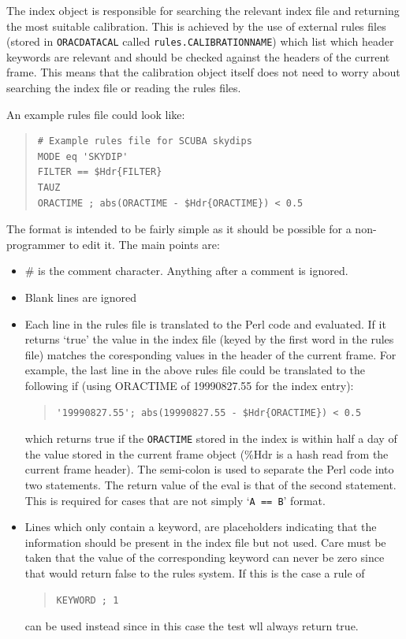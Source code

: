 \documentclass[twoside,11pt]{article}
\renewcommand{\_}{\texttt{\symbol{95}}}
\newenvironment{myquote}{\begin{quote}\begin{small}}{\end{small}\end{quote}}
\begin{document}
The index object is responsible for searching the relevant index
file and returning the most suitable calibration. This is achieved by
the use of external rules files (stored in \texttt{ORAC\_DATA\_CAL}
called \texttt{rules.CALIBRATION\_NAME}) which list which header
keywords are relevant and should be checked against the headers of the
current frame. This means that the calibration object itself does not
need to worry about searching the index file or reading the rules
files. 

An example rules file could look like:
\begin{myquote}
\begin{verbatim}
# Example rules file for SCUBA skydips
MODE eq 'SKYDIP'
FILTER == $Hdr{FILTER}
TAUZ
ORACTIME ; abs(ORACTIME - $Hdr{ORACTIME}) < 0.5
\end{verbatim}
\end{myquote}

The format is intended to be fairly simple as it should be possible
for a non-programmer to edit it. The main points are:

\begin{itemize}
\item \# is the comment character. Anything after a comment is
ignored.
\item Blank lines are ignored
\item Each line in the rules file is translated to the Perl code and
evaluated. If it returns `true' the value in the index file (keyed by
the first word in the rules file) matches the coresponding values in
the header of the current frame. For example, the last line in the
above rules file could be translated to the following if (using
ORACTIME of 19990827.55 for the index entry):
\begin{myquote}
\begin{verbatim}
'19990827.55'; abs(19990827.55 - $Hdr{ORACTIME}) < 0.5 
\end{verbatim}
\end{myquote} %
which returns true if the \texttt{ORACTIME} stored in the index is
within half a day of the value stored in the current frame object
(\%Hdr is a hash read from the current frame header).
The semi-colon is used to separate the Perl code into two statements.
The return value of the eval is that of the second statement. This is
required for cases that are not simply `\texttt{A == B}' format.
\item Lines which only contain a keyword, are placeholders indicating
that the information should be present in the index file but not used.
Care must be taken that the value of the corresponding keyword can never
be zero since that would return false to the rules system. If this is the 
case a rule of
\begin{myquote}
\begin{verbatim}
KEYWORD ; 1
\end{verbatim}
\end{myquote}
can be used instead since in this case the test wll always return true.
\end{itemize}
\end{document}

